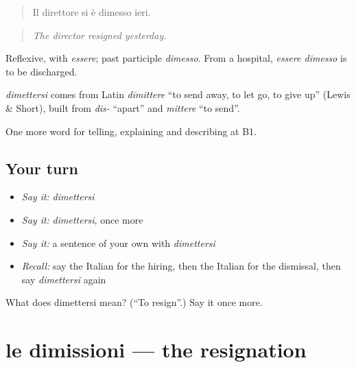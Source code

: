 \begin{quote}
Il direttore si è dimesso ieri.
\end{quote}

\begin{quote}
\emph{The director resigned yesterday.}
\end{quote}

Reflexive, with \emph{essere}; past participle \emph{dimesso}. From a hospital, \emph{essere dimesso} is to be discharged.

\begin{cousinweb}
\emph{dimettersi} comes from Latin \emph{dīmittere} \textquotedblleft{}to send away, to let go, to give up\textquotedblright{} (Lewis \& Short), built from \emph{dis-} \textquotedblleft{}apart\textquotedblright{} and \emph{mittere} \textquotedblleft{}to send\textquotedblright{}.
\end{cousinweb}

\begin{grammarlens}[title={What you've built}]
One more word for telling, explaining and describing at B1.
\end{grammarlens}

\subsection*{Your turn}
\begin{itemize}
\raggedright
  \item \emph{Say it:} \emph{dimettersi}
  \item \emph{Say it:} \emph{dimettersi}, once more
  \item \emph{Say it:} a sentence of your own with \emph{dimettersi}
  \item \emph{Recall:} say the Italian for the hiring, then the Italian for the dismissal, then say \emph{dimettersi} again
\end{itemize}

\begin{tcolorbox}[breakable,colback=teal!4,colframe=teal!35!black,title={Before you move on}]
What does dimettersi mean? (\textquotedblleft{}To resign\textquotedblright{}.) Say it once more.
\end{tcolorbox}
\section[le dimissioni]{le dimissioni — the resignation}

\label{lesson:IT-C357-dimissioni}



